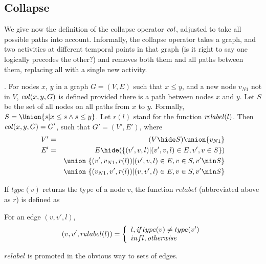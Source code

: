 \documentclass{elsarticle}
\begin{document}
\subsection{Collapse}

We give now the definition of the collapse operator $\col$, adjusted to take  all possible paths into account.
%
Informally, the collapse operator takes a graph, and two activities at different temporal points in that graph (is it right to say one logically precedes the other?) and removes both them and all paths between them, replacing all with a single new activity. 


\begin{definition}[$\col$]  \label{def:col}
.  For nodes $x$, $y$ in a graph $G = (V,E)$ such that $x \le y$, and a new node $v_{N1}$ not in $V$,  $\mathit{col}(x,y,G)$ is defined provided there is a path between nodes $x$ and $y$. Let $S$ be the set of all nodes on all paths from $x$ to $y$.
  Formally, $S=\Union \{s|x \le s \land s \le y\}$.
  Let $r(l)$ stand for the function $\mathit{relabel}(l)$. Then $\mathit{col}(x,y,G) =  G'$, such that $G'=(V',E')$, where 
  \begin{eqnarray*}
  V' & = & (V\hide S) \union \{v_{N1}\}     \\
  E' & = &  E\hide (
                   \{(v',v,l)| (v',v,l) \in E, v',v \in S\}
                  )\\
  && \union\ \{(v',v_{N1},r(l))|(v',v,l) \in E, v\in S, v'\nin S\}\\
                   && \union\ \{(v_{N1},v',r(l))|(v,v',l) \in E, v\in S, v' \nin S\}\\
  \end{eqnarray*}
\end{definition}
If $type(v)$ returns the type of a node $v$, the function $relabel$ (abbreviated above as $r$) is defined as 
\begin{definition}[$relabel$] \label{def:relabel}
  For an edge $(v,v',l)$, 
  \[
   (v,v',relabel(l)) = \left\{
   \begin{array}{l}
      l,    {\emph{if}}\; type(v) \neq type(v') \\
      infl, \emph{otherwise}
   \end{array}   \right.
  \]
\end{definition}
\noindent
$relabel$ is promoted in the obvious way to sets of edges.
\end{document}
